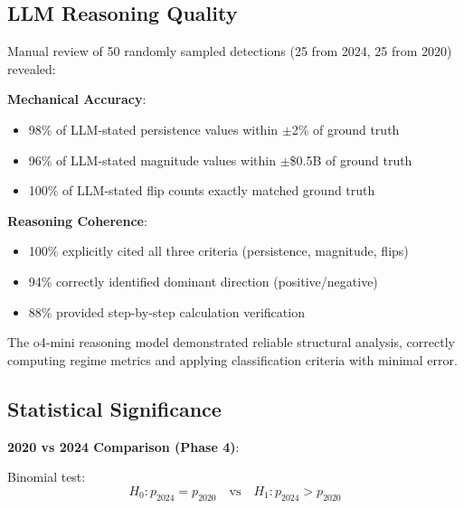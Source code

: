 \subsection{LLM Reasoning Quality}
\label{sec:reasoning_quality}

\vspace{0.2cm}

Manual review of 50 randomly sampled detections (25 from 2024, 25 from 2020) revealed:

\vspace{0.2cm}

\noindent\textbf{Mechanical Accuracy}:
\begin{itemize}
\item 98\% of LLM-stated persistence values within $\pm$2\% of ground truth
\item 96\% of LLM-stated magnitude values within $\pm$\$0.5B of ground truth
\item 100\% of LLM-stated flip counts exactly matched ground truth
\end{itemize}

\vspace{0.2cm}

\noindent\textbf{Reasoning Coherence}:
\begin{itemize}
\item 100\% explicitly cited all three criteria (persistence, magnitude, flips)
\item 94\% correctly identified dominant direction (positive/negative)
\item 88\% provided step-by-step calculation verification
\end{itemize}

\vspace{0.2cm}

The o4-mini reasoning model demonstrated reliable structural analysis, correctly computing regime metrics and applying classification criteria with minimal error.

\subsection{Statistical Significance}
\label{sec:statistical_significance}

\vspace{0.2cm}

\noindent\textbf{2020 vs 2024 Comparison (Phase 4)}:

\vspace{0.1cm}

Binomial test:
\begin{equation}
H_0: p_{2024} = p_{2020} \quad \text{vs} \quad H_1: p_{2024} > p_{2020}
\end{equation}


